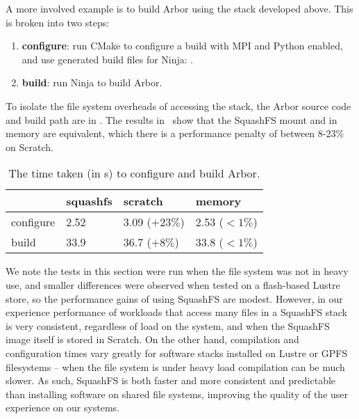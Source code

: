 A more involved example is to build Arbor using the stack developed above.
This is broken into two steps:
\begin{enumerate}
    \item \textbf{configure}: run CMake to configure a build with MPI and Python enabled, and use generated build files for Ninja: .
    \item \textbf{build}: run Ninja to build Arbor.
\end{enumerate}

To isolate the file system overheads of accessing the stack, the Arbor source code and build path are in .
The results in~ show that the SquashFS mount and in memory are equivalent, which there is a performance penalty of between 8-23\% on Scratch.

\begin{table}[htp!]
    \begin{center}
        \begin{tabular}{l | l l l}
                        & squashfs & scratch & memory \\
                \hline
            configure   & 2.52    & 3.09 ($+23\%$)  & 2.53 ($<1\%$) \\
            build       & 33.9    & 36.7 ($+8\%$)   & 33.8 ($<1\%$) \\
        \end{tabular}
    \end{center}
    \caption{The time taken (in s) to configure and build Arbor.}
    \label{tbl:arbor-compile}
\end{table}


We note the tests in this section were run when the file system was not in heavy use, and smaller differences were observed when tested on a flash-based Lustre store, so the performance gains of using SquashFS are modest.
However, in our experience performance of workloads that access many files in a SquashFS stack is very consistent, regardless of load on the system, and when the SquashFS image itself is stored in Scratch.
On the other hand, compilation and configuration times vary greatly for software stacks installed on Lustre or GPFS filesystems -- when the file system is under heavy load compilation can be much slower.
As such, SquashFS is both faster and more consistent and predictable than installing software on shared file systems, improving the quality of the user experience on our systems.

